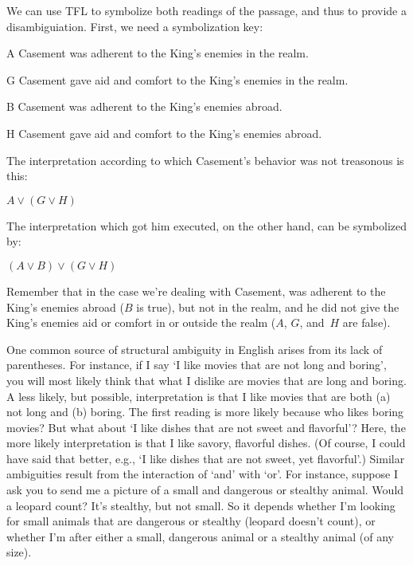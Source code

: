 We can use TFL to symbolize both readings of the passage, and thus to provide a disambiguiation. First, we need a symbolization key:
\begin{ekey}
	\item[A] Casement was adherent to the King's enemies in the realm.
	\item[G] Casement gave aid and comfort to the King's enemies in the realm.
	\item[B] Casement was adherent to the King's enemies abroad.
	\item[H] Casement gave aid and comfort to the King's enemies abroad.
\end{ekey}
The interpretation according to which Casement's behavior was not treasonous is this:
\begin{earg}
	\prem $A \lor (G \lor H)$
\end{earg}
The interpretation which got him executed, on the other hand, can be symbolized by:
\begin{earg}
	\prem $(A \lor B) \lor (G \lor H)$
\end{earg}
Remember that in the case we're dealing with Casement, was adherent to the King's enemies abroad ($B$ is true), but not in the realm, and he did not give the King's enemies aid or comfort in or outside the realm ($A$, $G$, and~$H$ are false).

One common source of structural ambiguity in English arises from its lack of parentheses. For instance, if I say `I like movies that are not long and boring', you will most likely think that what I dislike are movies that are long and boring. A less likely, but possible, interpretation is that I like movies that are both (a) not long and (b) boring. The first reading is more likely because who likes boring movies? But what about `I like dishes that are not sweet and flavorful'? Here, the more likely interpretation is that I like savory, flavorful dishes.  (Of course, I could have said that better, e.g., `I like dishes that are not sweet, yet flavorful'.) Similar ambiguities result from the interaction of `and' with `or'. For instance, suppose I ask you to send me a picture of a small and dangerous or stealthy animal.  Would a leopard count? It's stealthy, but not small. So it depends whether I'm looking for small animals that are dangerous or stealthy (leopard doesn't count), or whether I'm after either a small, dangerous animal or a stealthy animal (of any size).

